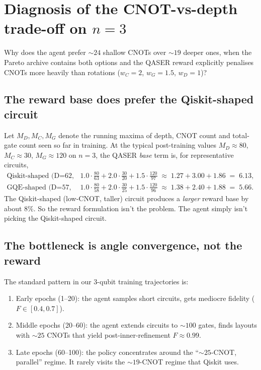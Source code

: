 \documentclass[11pt,a4paper]{article}
\begin{document}
\section{Diagnosis of the CNOT-vs-depth trade-off on $n=3$}
\label{sec:diagnosis}

Why does the agent prefer $\sim 24$ shallow CNOTs over $\sim 19$ deeper
ones, when the Pareto archive contains both options and the QASER reward
explicitly penalises CNOTs more heavily than rotations
($w_C = 2$, $w_G = 1.5$, $w_D = 1$)?

\subsection{The reward base does prefer the Qiskit-shaped circuit}

Let $M_D, M_C, M_G$ denote the running maxima of depth, CNOT count and
total-gate count seen so far in training. At the typical post-training
values $M_D \approx 80$, $M_C \approx 30$, $M_G \approx 120$ on $n=3$,
the QASER \emph{base} term is, for representative circuits,
\begin{align*}
\text{Qiskit-shaped (D=62, C=19, G=96):}\quad
& 1.0\cdot\tfrac{80}{63} + 2.0\cdot\tfrac{30}{20} + 1.5\cdot\tfrac{120}{97}
\;\approx\; 1.27 + 3.00 + 1.86 \;=\; 6.13,\\[2pt]
\text{GQE-shaped (D=57, C=24, G=95):}\quad
& 1.0\cdot\tfrac{80}{58} + 2.0\cdot\tfrac{30}{25} + 1.5\cdot\tfrac{120}{96}
\;\approx\; 1.38 + 2.40 + 1.88 \;=\; 5.66.
\end{align*}
The Qiskit-shaped (low-CNOT, taller) circuit produces a \emph{larger}
reward base by about $8\%$. So the reward formulation isn't the
problem. The agent simply isn't picking the Qiskit-shaped circuit.

\subsection{The bottleneck is angle convergence, not the reward}

The standard pattern in our 3-qubit training trajectories is:

\begin{enumerate}[leftmargin=2em]
\item Early epochs (1--20): the agent samples short circuits, gets
mediocre fidelity ($F \in [0.4, 0.7]$).
\item Middle epochs (20--60): the agent extends circuits to $\sim 100$
gates, finds layouts with $\sim 25$ CNOTs that yield post-inner-refinement
$F \approx 0.99$.
\item Late epochs (60--100): the policy concentrates around the
``$\sim 25$-CNOT, parallel'' regime. It rarely visits the
$\sim 19$-CNOT regime that Qiskit uses.
\end{enumerate}
\end{document}
